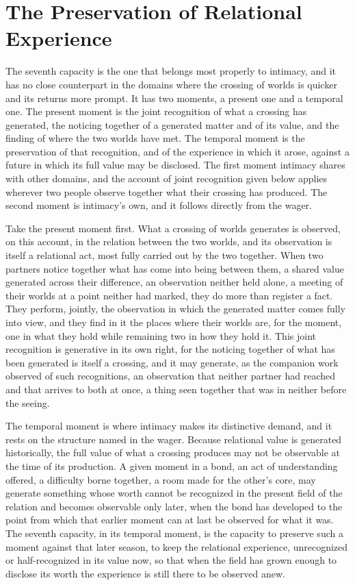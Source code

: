 \section{The Preservation of Relational Experience}
\label{p27:sec:preservation}

\noindent
The seventh capacity is the one that belongs most properly to intimacy, and it has no close counterpart in the domains where the crossing of worlds is quicker and its returns more prompt. It has two moments, a present one and a temporal one. The present moment is the joint recognition of what a crossing has generated, the noticing together of a generated matter and of its value, and the finding of where the two worlds have met. The temporal moment is the preservation of that recognition, and of the experience in which it arose, against a future in which its full value may be disclosed. The first moment intimacy shares with other domains, and the account of joint recognition given below applies wherever two people observe together what their crossing has produced. The second moment is intimacy's own, and it follows directly from the wager.

Take the present moment first. What a crossing of worlds generates is observed, on this account, in the relation between the two worlds, and its observation is itself a relational act, most fully carried out by the two together. When two partners notice together what has come into being between them, a shared value generated across their difference, an observation neither held alone, a meeting of their worlds at a point neither had marked, they do more than register a fact. They perform, jointly, the observation in which the generated matter comes fully into view, and they find in it the places where their worlds are, for the moment, one in what they hold while remaining two in how they hold it. This joint recognition is generative in its own right, for the noticing together of what has been generated is itself a crossing, and it may generate, as the companion work observed of such recognitions, an observation that neither partner had reached and that arrives to both at once, a thing seen together that was in neither before the seeing.

The temporal moment is where intimacy makes its distinctive demand, and it rests on the structure named in the wager. Because relational value is generated historically, the full value of what a crossing produces may not be observable at the time of its production. A given moment in a bond, an act of understanding offered, a difficulty borne together, a room made for the other's core, may generate something whose worth cannot be recognized in the present field of the relation and becomes observable only later, when the bond has developed to the point from which that earlier moment can at last be observed for what it was. The seventh capacity, in its temporal moment, is the capacity to preserve such a moment against that later season, to keep the relational experience, unrecognized or half-recognized in its value now, so that when the field has grown enough to disclose its worth the experience is still there to be observed anew.

